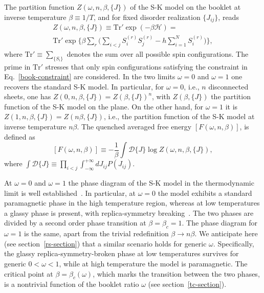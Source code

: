 \documentclass[twocolumn,superscriptaddress,prb,10pt]{revtex4-1}
\begin{document}
The partition function $Z(\omega,n,\beta,\{J\})$ of the S-K model on the booklet 
at inverse temperature $\beta\equiv 1/T$, and for fixed disorder realization 
$\{J_{ij}\}$, reads 
%
\begin{multline}
Z(\omega,n,\beta,\{J\})\equiv\textrm{Tr}'\exp(-\beta{\mathcal H})=\\
\textrm{Tr}'\exp\Big\{\beta\sum\limits_{r}\Big(
\sum\limits_{i<j}S^{(r)}_i 
S^{(r)}_j-h\sum\limits_{i=1}^NS^{(r)}_i\Big)\Big\},
\label{book-pf}
\end{multline}
%
where $\textrm{Tr}'\equiv \sum_{\{S_i\}}$ denotes the sum over all possible 
spin configurations. The prime in $\textrm{Tr}'$ stresses that only spin configurations 
satisfying the constraint in Eq.~\eqref{book-constraint} are considered. In the two limits 
$\omega=0$ and $\omega=1$ one recovers the standard S-K model. In particular, for $\omega=0$, 
i.e., $n$ disconnected sheets, one has $Z(0,n,\beta,\{J\})=Z(\beta,\{J\})^n$, with 
$Z(\beta,\{J\})$ the partition function of the S-K model on the plane. On the other hand, 
for $\omega=1$ it is $Z(1,n,\beta,\{J\})=Z(n\beta,\{J\})$, i.e., the partition function 
of the S-K model at inverse temperature $n\beta$. The quenched averaged free energy 
$[F(\omega,n,\beta)]$, is defined as 
%
\begin{equation}
\label{free-energy}
[F(\omega,n,\beta)]\equiv -\frac{1}{\beta}\int {\mathcal D}\{J\}
\log Z(\omega,n,\beta,\{J\}), 
\end{equation}
%
where $\int{\mathcal D}\{J\}\equiv\prod\nolimits_{i<j}\int_{-\infty}^{
+\infty}dJ_{ij}P(J_{ij})$. 

At $\omega=0$ and $\omega=1$ the phase diagram of the S-K model in the 
thermodynamic limit is well established~\cite{nishimori-book}. In particular, 
at $\omega=0$ the model exhibits a standard paramagnetic phase in the high 
temperature region, whereas at low temperatures a glassy phase is present, 
with replica-symmetry breaking~\cite{nishimori-book}. The two phases are 
divided by a second order phase transition at $\beta=\beta_c=1$. The phase 
diagram for $\omega=1$ is the same, apart from the trivial redefinition
$\beta\to n\beta$. We anticipate here (see section~\ref{rs-section}) that 
a similar scenario holds for generic $\omega$. Specifically, the glassy 
replica-symmetry-broken phase at low temperatures survives for generic 
$0<\omega<1$, while at high temperature the model is paramagnetic. The 
critical point at $\beta=\beta_c(\omega)$, which marks the transition 
between the two phases, is a nontrivial function of the booklet ratio 
$\omega$ (see section~\ref{tc-section}). 
\end{document}
